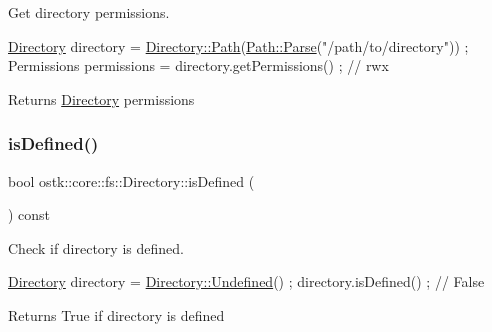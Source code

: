 Get directory permissions. 


\begin{DoxyCode}
\hyperlink{classostk_1_1core_1_1fs_1_1_directory_adc893e10f55282be0d0455e9cfc5796b}{Directory} directory = \hyperlink{classostk_1_1core_1_1fs_1_1_directory_a0151dba2940d5f426b52209dc7dab2e5}{Directory::Path}(\hyperlink{classostk_1_1core_1_1fs_1_1_path_ad08539ba654f5df11c4bcb07276345ad}{Path::Parse}(\textcolor{stringliteral}{"/path/to/directory"}))
       ;
Permissions permissions = directory.getPermissions() ; \textcolor{comment}{// rwx}
\end{DoxyCode}


\begin{DoxyReturn}{Returns}
\hyperlink{classostk_1_1core_1_1fs_1_1_directory}{Directory} permissions 
\end{DoxyReturn}
\mbox{\label{classostk_1_1core_1_1fs_1_1_directory_a51486912efcfa11f642ad419b7b9dd46}} 
\subsubsection{\texorpdfstring{is\+Defined()}{isDefined()}}
{\footnotesize\ttfamily bool ostk\+::core\+::fs\+::\+Directory\+::is\+Defined (\begin{DoxyParamCaption}{ }\end{DoxyParamCaption}) const}



Check if directory is defined. 


\begin{DoxyCode}
\hyperlink{classostk_1_1core_1_1fs_1_1_directory_adc893e10f55282be0d0455e9cfc5796b}{Directory} directory = \hyperlink{classostk_1_1core_1_1fs_1_1_directory_a1ead445a6b0f2b020ab61c2653bb8faa}{Directory::Undefined}() ;
directory.isDefined() ; \textcolor{comment}{// False}
\end{DoxyCode}


\begin{DoxyReturn}{Returns}
True if directory is defined 
\end{DoxyReturn}
\mbox{\label{classostk_1_1core_1_1fs_1_1_directory_a736757a78940be56153379e8b8305841}} 
